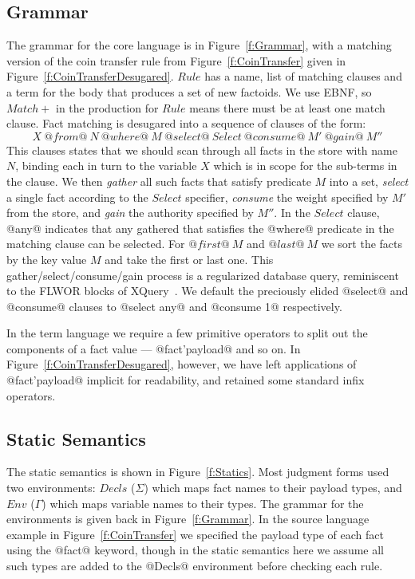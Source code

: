 \subsection{Grammar}
The grammar for the core language is in Figure~\ref{f:Grammar}, with a matching version of the coin transfer rule from Figure~\ref{f:CoinTransfer} given in Figure~\ref{f:CoinTransferDesugared}.
$Rule$ has a name, list of matching clauses and a term for the body that produces a set of new factoids. We use EBNF, so $Match+$ in the production for $Rule$ means there must be at least one match clause. Fact matching is desugared into a sequence of clauses of the form:
$$
X~ @from@~ N~ @where@~ M~ @select@~ Select~ @consume@~ M'~ @gain@~ M''
$$
This clauses states that we should scan through all facts in the store with name $N$, binding each in turn to the variable $X$ which is in scope for the sub-terms in the clause. We then \emph{gather} all such facts that satisfy predicate $M$ into a set, \emph{select} a single fact according to the $Select$ specifier, \emph{consume} the weight specified by $M'$ from the store, and \emph{gain} the authority specified by $M''$. In the $Select$ clause, @any@ indicates that any gathered that satisfies the @where@ predicate in the matching clause can be selected. For $@first@~ M$ and $@last@~ M$ we sort the facts by the key value $M$ and take the first or last one. This gather/select/consume/gain process is a regularized database query, reminiscent to the FLWOR blocks of XQuery~\cite{Boag2002:XQuery}. We default the preciously elided @select@ and @consume@ clauses to @select any@ and @consume 1@ respectively.

In the term language we require a few primitive operators to split out the components of a fact value --- @fact'payload@ and so on. In Figure~\ref{f:CoinTransferDesugared}, however, we have left applications of @fact'payload@ implicit for readability, and retained some standard infix operators.




\eject{}
\subsection{Static Semantics}
The static semantics is shown in Figure~\ref{f:Statics}. Most judgment forms used two environments: $Decls$ ($\Sigma$) which maps fact names to their payload types, and $Env$ ($\Gamma$) which maps variable names to their types. The grammar for the environments is given back in Figure~\ref{f:Grammar}. In the source language example in Figure~\ref{f:CoinTransfer} we specified the payload type of each fact using the @fact@ keyword, though in the static semantics here we assume all such types are added to the @Decls@ environment before checking each rule.

